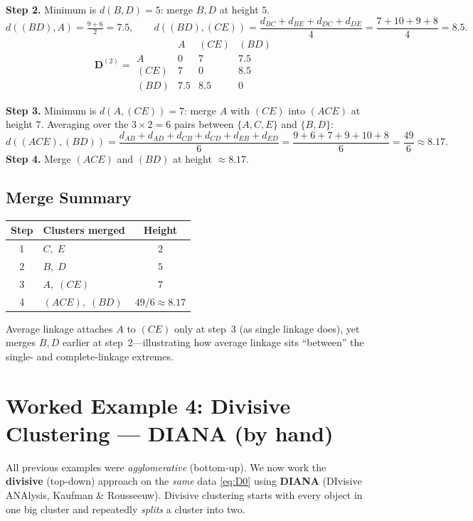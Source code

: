 \documentclass[11pt,a4paper]{report}
\theoremstyle{definition}
\theoremstyle{plain}
\theoremstyle{remark}
\begin{document}
\textbf{Step 2.} Minimum is $d(B,D)=5$: merge $B,D$ at height $5$.
\[
d((BD),A)=\tfrac{9+6}{2}=7.5,\qquad
d((BD),(CE))=\frac{d_{BC}+d_{BE}+d_{DC}+d_{DE}}{4}
=\frac{7+10+9+8}{4}=8.5 .
\]
\begin{equation}
\mathbf{D}^{(2)}=
\begin{array}{c|ccc}
     & A & (CE) & (BD)\\ \hline
A    & 0 & 7   & 7.5\\
(CE) & 7 & 0   & 8.5\\
(BD) &7.5& 8.5 & 0
\end{array}
\end{equation}

\textbf{Step 3.} Minimum is $d(A,(CE))=7$: merge $A$ with $(CE)$ into $(ACE)$ at
height $7$. Averaging over the $3\times2=6$ pairs between $\{A,C,E\}$ and
$\{B,D\}$:
\[
d((ACE),(BD))=\frac{d_{AB}+d_{AD}+d_{CB}+d_{CD}+d_{EB}+d_{ED}}{6}
=\frac{9+6+7+9+10+8}{6}=\frac{49}{6}\approx 8.17 .
\]
\textbf{Step 4.} Merge $(ACE)$ and $(BD)$ at height $\approx 8.17$.

\section{Merge Summary}
\begin{center}
\begin{tabular}{@{}clc@{}}
\toprule
Step & Clusters merged & Height\\
\midrule
1 & $C,\;E$        & $2$\\
2 & $B,\;D$        & $5$\\
3 & $A,\;(CE)$     & $7$\\
4 & $(ACE),\;(BD)$ & $49/6\approx8.17$\\
\bottomrule
\end{tabular}
\end{center}
Average linkage attaches $A$ to $(CE)$ only at step~3 (as single linkage does),
yet merges $B,D$ earlier at step~2---illustrating how average linkage sits
``between'' the single- and complete-linkage extremes.

\chapter{Worked Example 4: Divisive Clustering --- DIANA (by hand)}
\label{ch:diana}

All previous examples were \emph{agglomerative} (bottom-up). We now work the
\textbf{divisive} (top-down) approach on the \emph{same} data \eqref{eq:D0}
using \textbf{DIANA} (DIvisive ANAlysis, Kaufman \& Rousseeuw). Divisive
clustering starts with every object in one big cluster and repeatedly
\emph{splits} a cluster into two.
\end{document}
